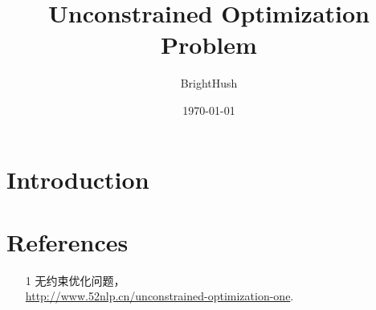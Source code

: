 \documentclass[UTF8]{ctexart}
\title{Unconstrained Optimization Problem}
\author{BrightHush}
\date{\today}
\begin{document}
\maketitle
\tableofcontents

\pagestyle{fancy}
\cfoot{\thepage}

\newcommand{\figref}[1]{\figurename~\ref{#1}}

\section{Introduction}


\section{References}
\begin{itemize}
\item[1] 无约束优化问题， \\
\url{http://www.52nlp.cn/unconstrained-optimization-one}.
\end{itemize}
\end{document}
